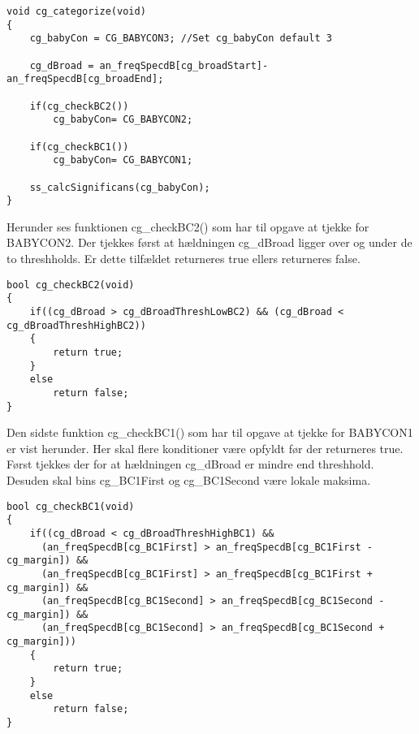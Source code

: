 \begin{verbatim}
void cg_categorize(void)
{
	cg_babyCon = CG_BABYCON3; //Set cg_babyCon default 3

	cg_dBroad = an_freqSpecdB[cg_broadStart]-an_freqSpecdB[cg_broadEnd];

	if(cg_checkBC2())
		cg_babyCon= CG_BABYCON2;

	if(cg_checkBC1())
		cg_babyCon= CG_BABYCON1;

	ss_calcSignificans(cg_babyCon);
}
\end{verbatim}

Herunder ses funktionen cg\_checkBC2() som har til opgave at tjekke for BABYCON2. 
Der tjekkes først at hældningen cg\_dBroad ligger over og under de to threshholds. Er dette tilfældet returneres true ellers returneres false. 

\begin{verbatim}
bool cg_checkBC2(void)
{
	if((cg_dBroad > cg_dBroadThreshLowBC2) && (cg_dBroad < cg_dBroadThreshHighBC2))
	{
		return true;
	}
	else
		return false;
}
\end{verbatim}

Den sidste funktion cg\_checkBC1() som har til opgave at tjekke for BABYCON1 er vist herunder. 
Her skal flere konditioner være opfyldt før der returneres true. Først tjekkes der for at hældningen cg\_dBroad er mindre end threshhold. Desuden skal bins cg\_BC1First og cg\_BC1Second være lokale maksima. 

\begin{verbatim}
bool cg_checkBC1(void)
{
	if((cg_dBroad < cg_dBroadThreshHighBC1) &&
	  (an_freqSpecdB[cg_BC1First] > an_freqSpecdB[cg_BC1First - cg_margin]) &&
	  (an_freqSpecdB[cg_BC1First] > an_freqSpecdB[cg_BC1First + cg_margin]) &&
	  (an_freqSpecdB[cg_BC1Second] > an_freqSpecdB[cg_BC1Second - cg_margin]) &&
	  (an_freqSpecdB[cg_BC1Second] > an_freqSpecdB[cg_BC1Second + cg_margin]))
	{
		return true;
	}
	else
		return false;
}
\end{verbatim}
